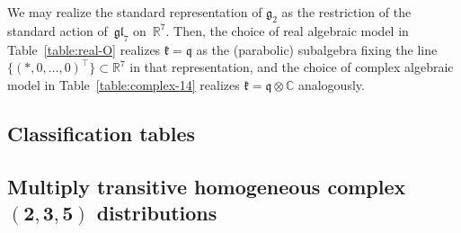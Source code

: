\documentclass[pdftex]{sigma}
\newcommand{\bbC}{\mathbb{C}}
\newcommand{\bbR}{\mathbb{R}}
\newcommand{\mfg} {\mathfrak{g}}
\newcommand{\mfh} {\mathfrak{h}}
\newcommand{\mfk} {\mathfrak{k}}
\newcommand{\mfq} {\mathfrak{q}}
\newcommand{\mfgl} {\mathfrak{gl}}
\numberwithin{equation}{section}
\begin{document}
We may realize the standard representation of $\mfg_2$ as the restriction of the standard action of~$\mfgl_7$ on~$\bbR^7$. Then, the choice of real algebraic model in Table~\ref{table:real-O} realizes $\mfk = \mfq$ as the (parabolic) subalgebra fixing the line $\big\{(\ast, 0, \ldots, 0)^{\top}\big\} \subset \bbR^7$ in that representation, and the choice of complex algebraic model in Table~\ref{table:complex-14} realizes $\mfk = \mfq \otimes \bbC$ analogously.

\newpage

\begin{landscape}

\section{Classification tables}\label{appendixB}

\subsection[Multiply transitive homogeneous complex $(2, 3, 5)$ distributions]{Multiply transitive homogeneous complex $\boldsymbol{(2, 3, 5)}$ distributions}

\begin{table}[htb]
\caption{Multiply transitive homogeneous complex $(2, 3, 5)$ distributions: $\dim \mfh = 14$.}\label{table:complex-14}\vspace{1mm}


\end{table}
\end{landscape}
\end{document}

